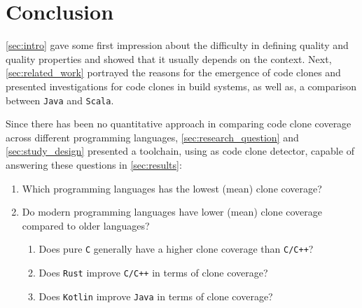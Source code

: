 
\section{Conclusion}
\label{sec:conclusion}

\autoref{sec:intro} gave some first impression about the difficulty in defining quality and quality properties and showed that it usually depends on the context. Next, \autoref{sec:related_work} portrayed the reasons for the emergence of code clones and presented investigations for code clones in build systems, as well as, a comparison between \texttt{Java} and \texttt{Scala}.

Since there has been no quantitative approach in comparing code clone coverage across different programming languages, \autoref{sec:research_question} and \autoref{sec:study_design} presented a toolchain, using \teamscale{} as code clone detector, capable of answering these questions in \autoref{sec:results}:
\begin{enumerate}
	\item Which programming languages has the lowest (mean) clone coverage?
	
	
	\item Do modern programming languages have lower (mean) clone coverage compared to older languages?
	
	
	\begin{enumerate}
		\item Does pure \texttt{C} generally have a higher clone coverage than \texttt{C/C++}?
		
		
		\item Does \texttt{Rust} improve \texttt{C/C++} in terms of clone coverage?
		
		
		\item Does \texttt{Kotlin} improve \texttt{Java} in terms of clone coverage?
		
	\end{enumerate}
\end{enumerate}

